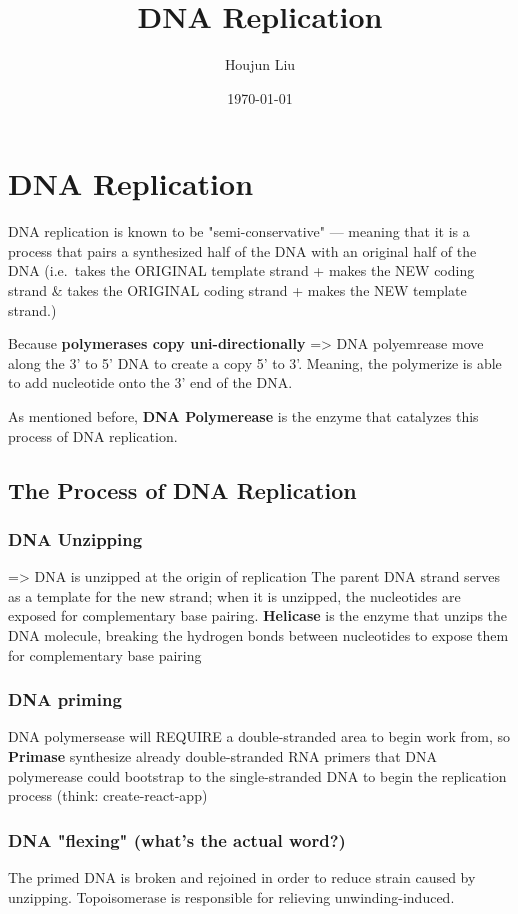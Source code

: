 \documentclass[letterpaper]{article}
\author{Houjun Liu}
\date{\today}
\title{DNA Replication}
\renewcommand\maketitle{}
\begin{document}
\maketitle


\section{DNA Replication}
\label{sec:org64468fd}
DNA replication is known to be "semi-conservative" --- meaning that it
is a process that pairs a synthesized half of the DNA with an original
half of the DNA (i.e. takes the ORIGINAL template strand + makes the NEW
coding strand \& takes the ORIGINAL coding strand + makes the NEW
template strand.)

Because \textbf{polymerases copy uni-directionally} => DNA polyemrease move
along the 3' to 5' DNA to create a copy 5' to 3'. Meaning, the
polymerize is able to add nucleotide onto the 3' end of the DNA.

As mentioned before, \textbf{DNA Polymerease} is the enzyme that catalyzes this
process of DNA replication.

\subsection{The Process of DNA Replication}
\label{sec:org01f8770}
\subsubsection{DNA Unzipping}
\label{sec:orgf95cb85}
=> DNA is unzipped at the origin of replication The parent DNA strand
serves as a template for the new strand; when it is unzipped, the
nucleotides are exposed for complementary base pairing. \textbf{Helicase} is
the enzyme that unzips the DNA molecule, breaking the hydrogen bonds
between nucleotides to expose them for complementary base pairing

\subsubsection{DNA priming}
\label{sec:org8927b76}
DNA polymersease will REQUIRE a double-stranded area to begin work from,
so \textbf{Primase} synthesize already double-stranded RNA primers that DNA
polymerease could bootstrap to the single-stranded DNA to begin the
replication process (think: create-react-app)

\subsubsection{DNA "flexing" (what's the actual word?)}
\label{sec:org9213f29}
The primed DNA is broken and rejoined in order to reduce strain caused
by unzipping. Topoisomerase is responsible for relieving
unwinding-induced.
\end{document}
